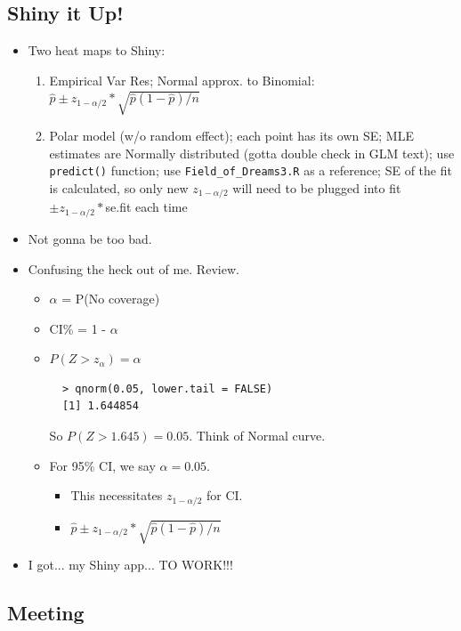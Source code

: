 \documentclass{article}
\begin{document}
\subsection*{Shiny it Up!}
\begin{itemize}
\item Two heat maps to Shiny: 
  \begin{enumerate}
  \item Empirical Var Res; Normal approx. to Binomial: $\hat{p} \pm z_{1-\alpha/2}*\sqrt{\hat{p}(1-\hat{p})/n}$
  \item Polar model (w/o random effect); each point has its own SE; MLE estimates are Normally distributed (gotta double check in GLM text); use \verb|predict()| function; use \verb|Field_of_Dreams3.R| as a reference; SE of the fit is calculated, so only new $z_{1-\alpha/2}$ will need to be plugged into fit $\pm z_{1-\alpha/2}*$se.fit each time
  \end{enumerate}
\item Not gonna be too bad.
\item Confusing the heck out of me. Review.
  \begin{itemize}
  \item $\alpha$ = P(No coverage)
  \item CI\% = 1 - $\alpha$
  \item $P(Z > z_{\alpha}) = \alpha$ 
  \begin{verbatim}
  > qnorm(0.05, lower.tail = FALSE)
  [1] 1.644854
  \end{verbatim}
  So $P(Z > 1.645) = 0.05$. Think of Normal curve. 
  \item For 95\% CI, we say $\alpha = 0.05$.
        \begin{itemize}
        \item This necessitates $z_{1-\alpha/2}$ for CI.
        \item $\hat{p} \pm z_{1-\alpha/2}*\sqrt{\hat{p}(1-\hat{p})/n}$
        \end{itemize}


  \end{itemize}
\item I got... my Shiny app... TO WORK!!! 
\end{itemize}

\subsection*{Meeting}
\end{document}
